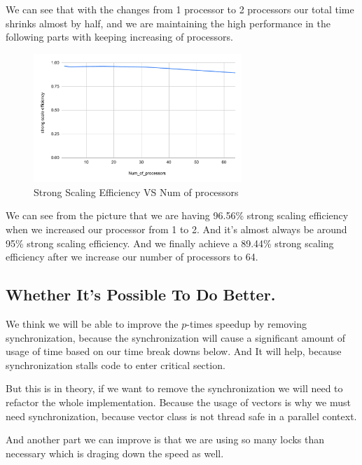 \documentclass{article}
\begin{document}
We can see that with the changes from 1 processor to 2 processors our total time shrinks almost by half, and we are maintaining the high performance in the following parts with keeping increasing of processors.

\begin{figure}[H] %
\centering %
\includegraphics[width=0.7\textwidth]{figures/strong scale efficiency vs. Num_of_processors.pdf} %
\caption{Strong Scaling Efficiency VS Num of processors} %
\label{Strong Scaling Efficiency VS Num of processors} %
\end{figure}

We can see from the picture that we are having 96.56\% strong scaling efficiency when we increased our processor from 1 to 2. And it's almost always be around 95\% strong scaling efficiency. And we finally achieve a 89.44\% strong scaling efficiency after we increase our number of processors to 64.
\subsection{Whether It's Possible To Do Better.}


We think we will be able to improve the $p$-times speedup by removing synchronization, because the synchronization will cause a significant amount of usage of time based on our time break downs below. And It will help, because synchronization stalls code to enter critical section.

But this is in theory, if we want to remove the synchronization we will need to refactor the whole implementation. Because the usage of vectors is why we must need synchronization, because vector class is not thread safe in a parallel context.

And another part we can improve is that we are using so many locks than necessary which is draging down the speed as well.
\end{document}
